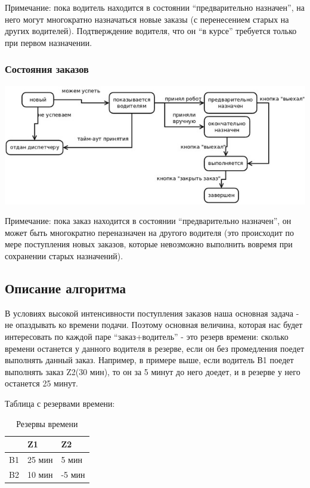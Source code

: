 			Примечание: пока водитель находится в состоянии “предварительно назначен”, на него могут многократно назначаться новые заказы (с перенесением старых на других водителей). Подтверждение водителя, что он “в курсе” требуется только при первом назначении.

		\subsubsection{Состояния заказов}

			\includegraphics{images/appendices/orders_state}

			Примечание: пока заказ находится в состоянии “предварительно назначен”, он может быть многократно переназначен на другого водителя (это происходит по мере поступления новых заказов, которые невозможно выполнить вовремя при сохранении старых назначений).

	\subsection{Описание алгоритма}

		В условиях высокой интенсивности поступления заказов наша основная задача - не опаздывать ко времени подачи.  Поэтому основная величина, которая нас будет интересовать по каждой паре “заказ+водитель” - это резерв времени: сколько времени останется у данного водителя в резерве, если он без промедления поедет выполнять данный заказ. Например, в примере выше, если водитель В1 поедет выполнять заказ Z2(30 мин), то он за 5 минут до него доедет, и в резерве у него останется 25 минут.

		Таблица с резервами времени:

		\begin{table}[htb]
	        \begin{center}
	        \caption{Резервы времени}
	        \label{appendices_algorithm_expl}
	        \setlength{\extrarowheight}{2mm}
	        \begin{tabular}{|p{2cm}|p{2cm}|p{2cm}|}
	           \hline   \textbf{ }&\textbf{Z1}&\textbf{Z2} \\ [2mm]

	           \hline B1 & 25 мин & 5 мин\\ [2mm]

	           \hline B2 & 10 мин & -5 мин\\ [2mm]    

	           \hline
	        \end{tabular}
	        \end{center}
      	\end{table}

